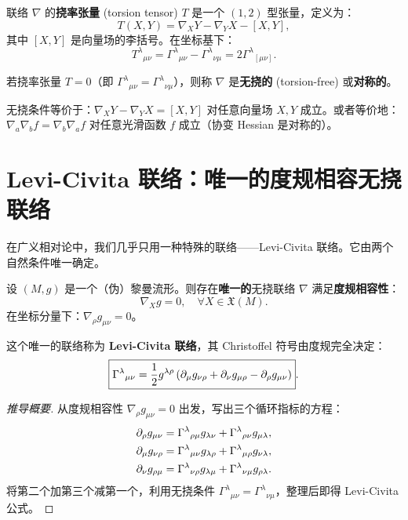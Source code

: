 \begin{definition}[挠率张量]
联络 $\nabla$ 的\textbf{挠率张量} (torsion tensor) $T$ 是一个 $(1,2)$ 型张量，定义为：
\begin{equation}
    T(X, Y) = \nabla_X Y - \nabla_Y X - [X, Y],
\end{equation}
其中 $[X, Y]$ 是向量场的李括号。在坐标基下：
\begin{equation}
    T^\lambda{}_{\mu\nu} = \Gamma^\lambda{}_{\mu\nu} - \Gamma^\lambda{}_{\nu\mu} = 2 \Gamma^\lambda{}_{[\mu\nu]}.
\end{equation}
\end{definition}

\begin{definition}[无挠联络]
若挠率张量 $T = 0$（即 $\Gamma^\lambda{}_{\mu\nu} = \Gamma^\lambda{}_{\nu\mu}$），则称 $\nabla$ 是\textbf{无挠的} (torsion-free) 或\textbf{对称的}。

无挠条件等价于：$\nabla_X Y - \nabla_Y X = [X, Y]$ 对任意向量场 $X, Y$ 成立。或者等价地：$\nabla_a \nabla_b f = \nabla_b \nabla_a f$ 对任意光滑函数 $f$ 成立（协变 Hessian 是对称的）。
\end{definition}

\section{Levi-Civita 联络：唯一的度规相容无挠联络}

在广义相对论中，我们几乎只用一种特殊的联络——Levi-Civita 联络。它由两个自然条件唯一确定。

\begin{theorem}
设 $(M, g)$ 是一个（伪）黎曼流形。则存在\textbf{唯一的}无挠联络 $\nabla$ 满足\textbf{度规相容性}：
\begin{equation}
    \nabla_X g = 0, \quad \forall X \in \mathfrak{X}(M).
\end{equation}
在坐标分量下：$\nabla_\rho g_{\mu\nu} = 0$。

这个唯一的联络称为 \textbf{Levi-Civita 联络}，其 Christoffel 符号由度规完全决定：
\begin{equation}
    \boxed{\Gamma^\lambda{}_{\mu\nu} = \frac{1}{2} g^{\lambda\rho} \left( \partial_\mu g_{\nu\rho} + \partial_\nu g_{\mu\rho} - \partial_\rho g_{\mu\nu} \right)}.
\end{equation}
\end{theorem}

\begin{proof}[推导概要]
从度规相容性 $\nabla_\rho g_{\mu\nu} = 0$ 出发，写出三个循环指标的方程：
\begin{align}
    \partial_\rho g_{\mu\nu} &= \Gamma^\lambda{}_{\rho\mu} g_{\lambda\nu} + \Gamma^\lambda{}_{\rho\nu} g_{\mu\lambda}, \\
    \partial_\mu g_{\nu\rho} &= \Gamma^\lambda{}_{\mu\nu} g_{\lambda\rho} + \Gamma^\lambda{}_{\mu\rho} g_{\nu\lambda}, \\
    \partial_\nu g_{\rho\mu} &= \Gamma^\lambda{}_{\nu\rho} g_{\lambda\mu} + \Gamma^\lambda{}_{\nu\mu} g_{\rho\lambda}.
\end{align}
将第二个加第三个减第一个，利用无挠条件 $\Gamma^\lambda{}_{\mu\nu} = \Gamma^\lambda{}_{\nu\mu}$，整理后即得 Levi-Civita 公式。
\end{proof}

